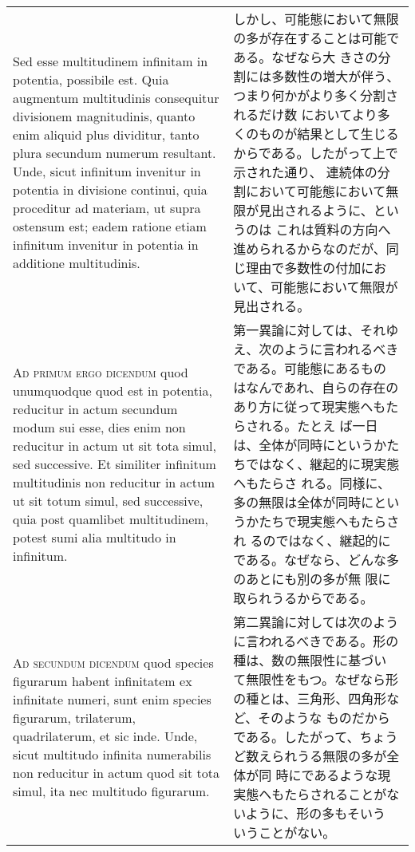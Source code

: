 \documentclass[10pt]{jsarticle} %
\begin{document}
\begin{longtable}{p{21em}p{21em}}
\\

Sed esse multitudinem infinitam in potentia, possibile est. Quia
 augmentum multitudinis consequitur divisionem magnitudinis, quanto enim
 aliquid plus dividitur, tanto plura secundum numerum resultant. Unde,
 sicut infinitum invenitur in potentia in divisione continui, quia
 proceditur ad materiam, ut supra ostensum est; eadem ratione etiam
 infinitum invenitur in potentia in additione multitudinis.

&

しかし、可能態において無限の多が存在することは可能である。なぜなら大
 きさの分割には多数性の増大が伴う、つまり何かがより多く分割されるだけ数
 においてより多くのものが結果として生じるからである。したがって上で示された通り、
 連続体の分割において可能態において無限が見出されるように、というのは
 これは質料の方向へ進められるからなのだが、同じ理由で多数性の付加にお
 いて、可能態において無限が見出される。


\\


{\scshape Ad primum ergo dicendum} quod unumquodque quod est in potentia,
 reducitur in actum secundum modum sui esse, dies enim non reducitur in
 actum ut sit tota simul, sed successive. Et similiter infinitum
 multitudinis non reducitur in actum ut sit totum simul, sed successive,
 quia post quamlibet multitudinem, potest sumi alia multitudo in
 infinitum.

&

第一異論に対しては、それゆえ、次のように言われるべきである。可能態にあるもの
 はなんであれ、自らの存在のあり方に従って現実態ヘもたらされる。たとえ
 ば一日は、全体が同時にというかたちではなく、継起的に現実態ヘもたらさ
 れる。同様に、多の無限は全体が同時にというかたちで現実態ヘもたらされ
 るのではなく、継起的にである。なぜなら、どんな多のあとにも別の多が無
 限に取られうるからである。


\\

{\scshape Ad secundum dicendum} quod species figurarum habent infinitatem ex
 infinitate numeri, sunt enim species figurarum, trilaterum,
 quadrilaterum, et sic inde. Unde, sicut multitudo infinita numerabilis
 non reducitur in actum quod sit tota simul, ita nec multitudo
 figurarum.

&

第二異論に対しては次のように言われるべきである。形の種は、数の無限性に基づい
 て無限性をもつ。なぜなら形の種とは、三角形、四角形など、そのような
 ものだからである。したがって、ちょうど数えられうる無限の多が全体が同
 時にであるような現実態ヘもたらされることがないように、形の多もそいう
 いうことがない。





\end{longtable}
\end{document}

